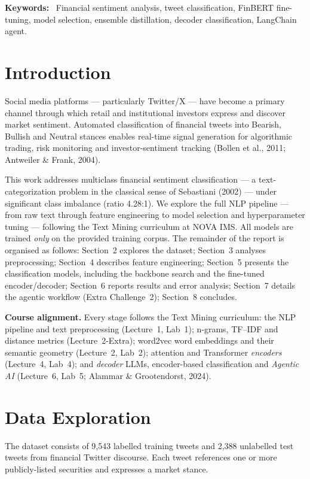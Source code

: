 \documentclass[11pt,a4paper]{article}
\newcommand{\tH}[1]{\textcolor{maincolor}{\textbf{#1}}}
\begin{document}
\vspace{2pt}
{\footnotesize\tH{Keywords:}~ Financial sentiment analysis, tweet classification, FinBERT
fine-tuning, model selection, ensemble distillation, decoder classification, LangChain agent.}

\section{Introduction}
Social media platforms --- particularly Twitter/X --- have become a primary channel through which
retail and institutional investors express and discover market sentiment. Automated classification
of financial tweets into Bearish, Bullish and Neutral stances enables real-time signal generation
for algorithmic trading, risk monitoring and investor-sentiment tracking (Bollen et al., 2011;
Antweiler \& Frank, 2004).

This work addresses multiclass financial sentiment classification --- a text-categorization
problem in the classical sense of Sebastiani (2002) --- under significant class imbalance
(ratio 4.28:1). We explore the full NLP pipeline --- from raw text through feature engineering to
model selection and hyperparameter tuning --- following the Text Mining curriculum at NOVA IMS. All
models are trained \emph{only} on the provided training corpus. The remainder of the report is
organised as follows: Section~2 explores the dataset; Section~3 analyses preprocessing; Section~4
describes feature engineering; Section~5 presents the classification models, including the backbone
search and the fine-tuned encoder/decoder; Section~6 reports results and error analysis; Section~7
details the agentic workflow (Extra Challenge~2); Section~8 concludes.

\textbf{Course alignment.} Every stage follows the Text Mining curriculum: the NLP pipeline and
text preprocessing (Lecture~1, Lab~1); n-grams, TF--IDF and distance metrics (Lecture~2-Extra);
word2vec word embeddings and their semantic geometry (Lecture~2, Lab~2); attention and Transformer
\emph{encoders} (Lecture~4, Lab~4); and \emph{decoder} LLMs, encoder-based classification and
\emph{Agentic AI} (Lecture~6, Lab~5; Alammar \& Grootendorst, 2024).

\section{Data Exploration}
The dataset consists of 9{,}543 labelled training tweets and 2{,}388 unlabelled test tweets from
financial Twitter discourse. Each tweet references one or more publicly-listed securities and
expresses a market stance.
\end{document}
